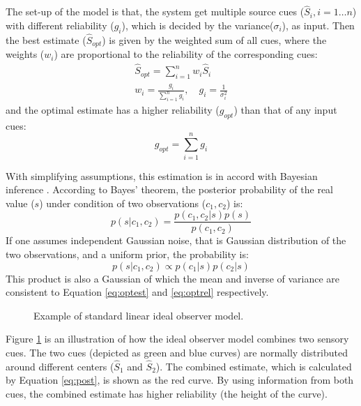 \documentclass{article}[11pt]
\newcommand{\inputTikZ}[1]{%
}
\begin{document}
The set-up of the model is that, the system get multiple source cues ($\hat{S}_i, i=1 \dots n$) with different reliability ($g_i$), which is decided by the variance($\sigma_i$), as input. Then the best estimate ($\hat{S}_{opt}$) is given by the weighted sum of all cues, where the weights ($w_i$) are proportional to the reliability of the corresponding cues:
\begin{gather}
  \hat{S}_{opt} = \sum_{i=1}^{n} w_i \hat{S}_i \label{eq:optest} \\
  w_i = \frac{g_i}{\sum_{i=1}^{n} g_i}, \quad g_i = \frac{1}{\sigma_i^2} \label{eq:optweight}
\end{gather}
and the optimal estimate has a higher reliability ($g_{opt}$) than that of any input cues:
\begin{equation}
  g_{opt} = \sum_{i=1}^{n} g_i \label{eq:optrel}
\end{equation}

With simplifying assumptions, this estimation is in accord with Bayesian inference \cite{knill_bayesian_2004}. According to Bayes' theorem, the posterior probability of the real value ($s$) under condition of two observations ($c_1, c_2$) is:
\begin{equation}
  p(s|c_1,c_2) = \frac{p(c_1,c_2|s)p(s)}{p(c_1,c_2)}
\end{equation}
If one assumes independent Gaussian noise, that is Gaussian distribution of the two observations, and a uniform prior, the probability is:
\begin{equation} \label{eq:post}
  p(s|c_1,c_2) \propto p(c_1|s)p(c_2|s)
\end{equation}
This product is also a Gaussian of which the mean and inverse of variance are consistent to Equation \ref{eq:optest} and \ref{eq:optrel} respectively.

\begin{figure}[tpb]
  \centering \inputTikZ{bayes}
  \caption{Example of standard linear ideal observer model.}
  \label{fig:bayes}
\end{figure}

Figure \ref{fig:bayes} is an illustration of how the ideal observer model combines two sensory cues. The two cues (depicted as green and blue curves) are normally distributed around different centers ($\hat{S}_1$ and $\hat{S}_2$). The combined estimate, which is calculated by Equation \ref{eq:post}, is shown as the red curve. By using information from both cues, the combined estimate has higher reliability (the height of the curve).
\end{document}
